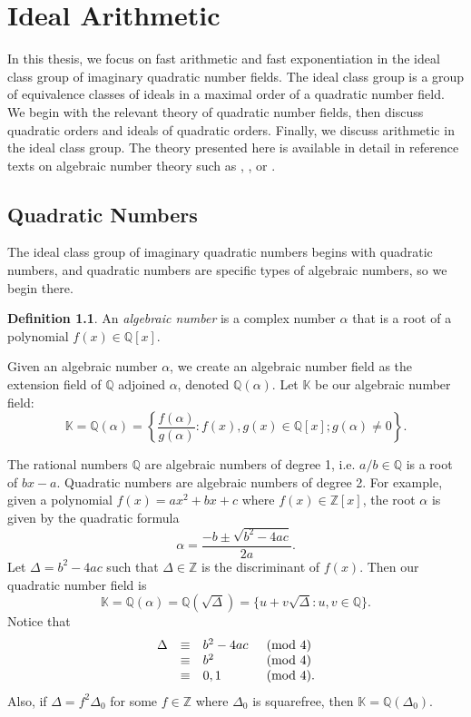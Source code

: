 \documentclass{ucalgthes1}
\theoremstyle{plain}
\theoremstyle{definition}
\newtheorem{defn}[thm]{Definition}
\newcommand{\KK}{\mathbb{K}}
\newcommand{\ZZ}{\mathbb{Z}}
\newcommand{\QQ}{\mathbb{Q}}
\begin{document}
\setcounter{chapter}{1}
\chapter{Ideal Arithmetic}

In this thesis, we focus on fast arithmetic and fast exponentiation in the ideal class group of imaginary quadratic number fields.  The ideal class group is a group of equivalence classes of ideals in a maximal order of a quadratic number field.   We begin with the relevant theory of quadratic number fields, then discuss quadratic orders and ideals of quadratic orders.  Finally, we discuss arithmetic in the ideal class group.  The theory presented here is available in detail in reference texts on algebraic number theory such as \cite{IR90}, \cite{Hua82}, or \cite{Coh80}. 



\section{Quadratic Numbers}

The ideal class group of imaginary quadratic numbers begins with quadratic numbers, and quadratic numbers are specific types of algebraic numbers, so we begin there.   

\begin{defn}
An \emph{algebraic number} is a complex number $\alpha$ that is a root of a polynomial $f(x) \in \QQ[x]$.
\end{defn}

\noindent
Given an algebraic number $\alpha$, we create an algebraic number field as the extension field of $\QQ$ adjoined $\alpha$, denoted $\QQ(\alpha)$. Let $\KK$ be our algebraic number field:
\[
	\KK = \QQ(\alpha) = \left\{ \frac{f(\alpha)}{g(\alpha)} : f(x), g(x) \in \QQ[x]; g(\alpha) \ne 0 \right\}.
\]

\noindent
The rational numbers $\QQ$ are algebraic numbers of degree 1, i.e. $a/b \in \QQ$ is a root of $bx - a$.  Quadratic numbers are algebraic numbers of degree 2.  For example, given a polynomial $f(x) = ax^2 + bx + c$ where $f(x) \in \ZZ[x]$, the root $\alpha$ is given by the quadratic formula
\[
	\alpha = \frac{-b \pm \sqrt{b^2 - 4ac}}{2a}.
\]
Let $\Delta = b^2 -4ac$ such that $\Delta \in \ZZ$ is the discriminant of $f(x)$.  Then our quadratic number field is 
\[
	\KK = \QQ(\alpha) = \QQ(\sqrt{\Delta}) = \{u + v\sqrt{\Delta} : u,v \in \QQ\}.
\]
Notice that
\begin{eqnarray*}
\begin{array}{l l l l}
	\Delta & \equiv & b^2-4ac & \pmod 4 \\
	& \equiv & b^2 & \pmod 4 \\
	& \equiv & 0,1 & \pmod 4.
\end{array}
\end{eqnarray*}
Also, if $\Delta = f^2 \Delta_0$ for some $f \in \ZZ$ where $\Delta_0$ is squarefree, then $\KK = \QQ(\Delta_0)$.
\end{document}
